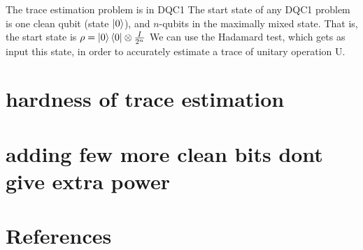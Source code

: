 \documentclass[leqno,fleqn]{beamer}
\begin{document}
\begin{frame}[label=sec-1-7]{The trace estimation problem is in DQC1}
The start state of any DQC1 problem is one clean qubit (state \(\ket{0}\)), and \(n\)-qubits in the maximally mixed state. That is, the start state is \(\rho = \ket{0}\bra{0} \otimes \frac{I}{2^n}\) We can use the Hadamard test, which gets as input this state, in order to accurately estimate a trace of unitary operation U.
\end{frame}
\section{hardness of trace estimation}
\label{sec-2}
\section{adding few more clean bits dont give extra power}
\label{sec-3}
\section{References}
\label{sec-4}
\end{document}

